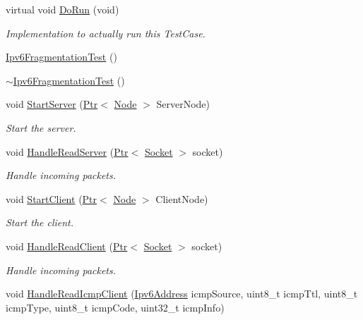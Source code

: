\begin{DoxyCompactItemize}
\item 
virtual void \hyperlink{classIpv6FragmentationTest_a83bd2f74ceac188b83cfb604a90c7b7b}{Do\+Run} (void)
\begin{DoxyCompactList}\small\item\em Implementation to actually run this Test\+Case. \end{DoxyCompactList}\item 
\hyperlink{classIpv6FragmentationTest_a22c35d4cf2723a7c64301c3cd05963b9}{Ipv6\+Fragmentation\+Test} ()
\item 
\hyperlink{classIpv6FragmentationTest_a08b345c279d680f160b253618e8065a4}{$\sim$\+Ipv6\+Fragmentation\+Test} ()
\item 
void \hyperlink{classIpv6FragmentationTest_a9e17748c96724c7a7b1af39ab54bdbfa}{Start\+Server} (\hyperlink{classns3_1_1Ptr}{Ptr}$<$ \hyperlink{classns3_1_1Node}{Node} $>$ Server\+Node)
\begin{DoxyCompactList}\small\item\em Start the server. \end{DoxyCompactList}\item 
void \hyperlink{classIpv6FragmentationTest_a3e548835f02712c58b19277eb0aeb110}{Handle\+Read\+Server} (\hyperlink{classns3_1_1Ptr}{Ptr}$<$ \hyperlink{classns3_1_1Socket}{Socket} $>$ socket)
\begin{DoxyCompactList}\small\item\em Handle incoming packets. \end{DoxyCompactList}\item 
void \hyperlink{classIpv6FragmentationTest_afe87fca4651780b7210efb45a77eadff}{Start\+Client} (\hyperlink{classns3_1_1Ptr}{Ptr}$<$ \hyperlink{classns3_1_1Node}{Node} $>$ Client\+Node)
\begin{DoxyCompactList}\small\item\em Start the client. \end{DoxyCompactList}\item 
void \hyperlink{classIpv6FragmentationTest_ad6c91384e008c34c6b4eb7f60fc7ba31}{Handle\+Read\+Client} (\hyperlink{classns3_1_1Ptr}{Ptr}$<$ \hyperlink{classns3_1_1Socket}{Socket} $>$ socket)
\begin{DoxyCompactList}\small\item\em Handle incoming packets. \end{DoxyCompactList}\item 
void \hyperlink{classIpv6FragmentationTest_a71cb73de46321641ac92d33df9cfc580}{Handle\+Read\+Icmp\+Client} (\hyperlink{classns3_1_1Ipv6Address}{Ipv6\+Address} icmp\+Source, uint8\+\_\+t icmp\+Ttl, uint8\+\_\+t icmp\+Type, uint8\+\_\+t icmp\+Code, uint32\+\_\+t icmp\+Info)

\end{DoxyCompactItemize}
